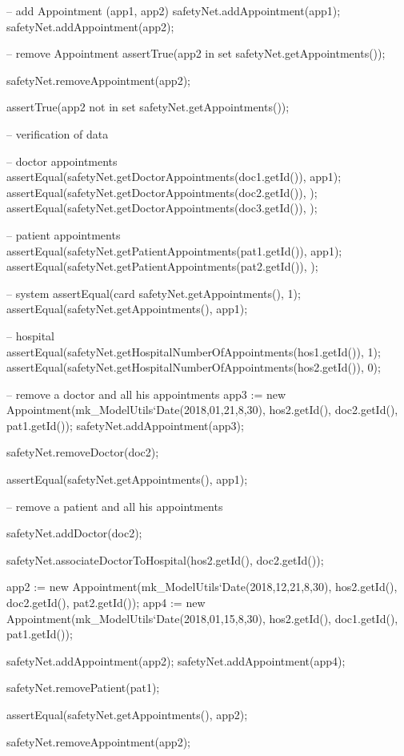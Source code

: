 \begin{vdmpp}[breaklines=true]
  
  -- add Appointment (app1, app2)
  safetyNet.addAppointment(app1);
  safetyNet.addAppointment(app2);


  -- remove Appointment
  assertTrue(app2 in set safetyNet.getAppointments());
  
  safetyNet.removeAppointment(app2);
  
  assertTrue(app2 not in set safetyNet.getAppointments());
  
  -- verification of data
  
  -- doctor appointments
  assertEqual(safetyNet.getDoctorAppointments(doc1.getId()), {app1});
  assertEqual(safetyNet.getDoctorAppointments(doc2.getId()), {});
  assertEqual(safetyNet.getDoctorAppointments(doc3.getId()), {});
  
  -- patient appointments
  assertEqual(safetyNet.getPatientAppointments(pat1.getId()), {app1});
  assertEqual(safetyNet.getPatientAppointments(pat2.getId()), {});

  -- system
  assertEqual(card safetyNet.getAppointments(), 1);
  assertEqual(safetyNet.getAppointments(), {app1});
  
  -- hospital
  assertEqual(safetyNet.getHospitalNumberOfAppointments(hos1.getId()), 1);
  assertEqual(safetyNet.getHospitalNumberOfAppointments(hos2.getId()), 0);  


  -- remove a doctor and all his appointments
  app3 := new Appointment(mk_ModelUtils`Date(2018,01,21,8,30), hos2.getId(), doc2.getId(), pat1.getId());
  safetyNet.addAppointment(app3);
  
  safetyNet.removeDoctor(doc2);
  
  assertEqual(safetyNet.getAppointments(), {app1}); 
  
  
  -- remove a patient and all his appointments
  
  safetyNet.addDoctor(doc2);
  
  safetyNet.associateDoctorToHospital(hos2.getId(), doc2.getId());
    
  app2 := new Appointment(mk_ModelUtils`Date(2018,12,21,8,30), hos2.getId(), doc2.getId(), pat2.getId());
  app4 := new Appointment(mk_ModelUtils`Date(2018,01,15,8,30), hos2.getId(), doc1.getId(), pat1.getId());
  
  safetyNet.addAppointment(app2);
  safetyNet.addAppointment(app4);
  
  safetyNet.removePatient(pat1);
  
  assertEqual(safetyNet.getAppointments(), {app2}); 
  
  safetyNet.removeAppointment(app2);
  

\end{vdmpp}
